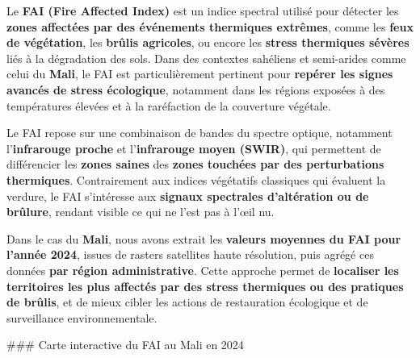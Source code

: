 \documentclass[
]{book}
\begin{document}
Le \textbf{FAI (Fire Affected Index)} est un indice spectral utilisé pour détecter les \textbf{zones affectées par des événements thermiques extrêmes}, comme les \textbf{feux de végétation}, les \textbf{brûlis agricoles}, ou encore les \textbf{stress thermiques sévères} liés à la dégradation des sols. Dans des contextes sahéliens et semi-arides comme celui du \textbf{Mali}, le FAI est particulièrement pertinent pour \textbf{repérer les signes avancés de stress écologique}, notamment dans les régions exposées à des températures élevées et à la raréfaction de la couverture végétale.

Le FAI repose sur une combinaison de bandes du spectre optique, notamment l'\textbf{infrarouge proche} et l'\textbf{infrarouge moyen (SWIR)}, qui permettent de différencier les \textbf{zones saines} des \textbf{zones touchées par des perturbations thermiques}. Contrairement aux indices végétatifs classiques qui évaluent la verdure, le FAI s'intéresse aux \textbf{signaux spectrales d'altération ou de brûlure}, rendant visible ce qui ne l'est pas à l'œil nu.

Dans le cas du \textbf{Mali}, nous avons extrait les \textbf{valeurs moyennes du FAI pour l'année 2024}, issues de rasters satellites haute résolution, puis agrégé ces données \textbf{par région administrative}. Cette approche permet de \textbf{localiser les territoires les plus affectés par des stress thermiques ou des pratiques de brûlis}, et de mieux cibler les actions de restauration écologique et de surveillance environnementale.

\#\#\#️ Carte interactive du FAI au Mali en 2024
\end{document}
